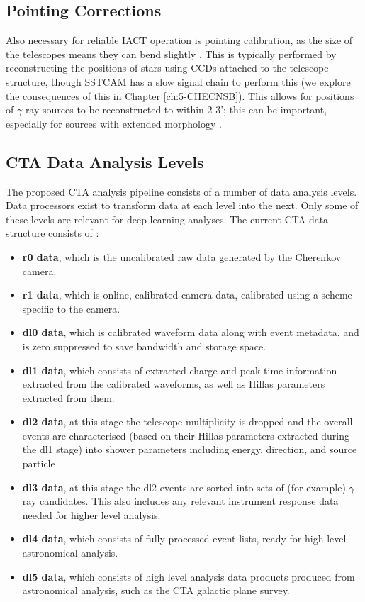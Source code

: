 \subsection{Pointing Corrections}
Also necessary for reliable IACT operation is pointing calibration, as the size of the telescopes means they can bend slightly \cite{veritasstat}. This is typically performed by reconstructing the positions of stars using CCDs attached to the telescope structure, though SSTCAM has a slow signal chain to perform this (we explore the consequences of this in Chapter \ref{ch:5-CHECNSB}). This allows for positions of $\gamma$-ray sources to be reconstructed to within 2-3'; this can be important, especially for sources with extended morphology \cite{cena} \cite{rxjcta}.

\subsection{CTA Data Analysis Levels}

The proposed CTA analysis pipeline consists of a number of data analysis levels. Data processors exist to transform data at each level into the next. Only some of these levels are relevant for deep learning analyses. The current CTA data structure consists of \cite{jasonthesis}:
\begin{itemize}
    \item \textbf{r0 data}, which is the uncalibrated raw data generated by the Cherenkov camera.
    \item \textbf{r1 data}, which is online, calibrated camera data, calibrated using a scheme specific to the camera.
    \item \textbf{dl0 data}, which is calibrated waveform data along with event metadata, and is zero suppressed to save bandwidth and storage space.
    \item \textbf{dl1 data}, which consists of extracted charge and peak time information extracted from the calibrated waveforms, as well as Hillas parameters extracted from them.
    \item \textbf{dl2 data}, at this stage the telescope multiplicity is dropped and the overall events are characterised (based on their Hillas parameters extracted during the dl1 stage) into shower parameters including energy, direction, and source particle
    \item \textbf{dl3 data}, at this stage the dl2 events are sorted into sets of (for example) $\gamma$-ray candidates. This also includes any relevant instrument response data needed for higher level analysis.
    \item \textbf{dl4 data}, which consists of fully processed event lists, ready for high level astronomical analysis.
    \item \textbf{dl5 data}, which consists of high level analysis data products produced from astronomical analysis, such as the CTA galactic plane survey.
\end{itemize}

